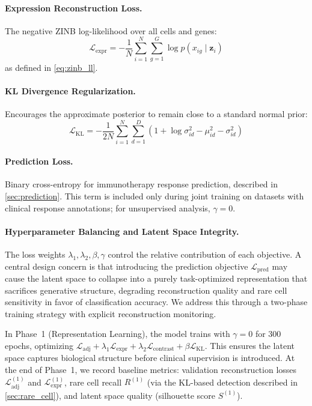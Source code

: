 \documentclass{article}
\newcommand{\KL}{\mathrm{KL}}
\begin{document}
\paragraph{Expression Reconstruction Loss.} The negative ZINB log-likelihood over all cells and genes:
\begin{equation}
    \mathcal{L}_{\text{expr}} = -\frac{1}{N} \sum_{i=1}^{N} \sum_{g=1}^{G} \log p(x_{ig} \mid \mathbf{z}_i)
    \label{eq:expr_loss}
\end{equation}
as defined in \cref{eq:zinb_ll}.

\paragraph{KL Divergence Regularization.} Encourages the approximate posterior to remain close to a standard normal prior:
\begin{equation}
    \mathcal{L}_{\KL} = -\frac{1}{2N} \sum_{i=1}^{N} \sum_{d=1}^{D} \left(1 + \log \sigma_{id}^2 - \mu_{id}^2 - \sigma_{id}^2\right)
    \label{eq:kl_loss}
\end{equation}

\paragraph{Prediction Loss.} Binary cross-entropy for immunotherapy response prediction, described in \cref{sec:prediction}. This term is included only during joint training on datasets with clinical response annotations; for unsupervised analysis, $\gamma = 0$.

\paragraph{Hyperparameter Balancing and Latent Space Integrity.} The loss weights $\lambda_1, \lambda_2, \beta, \gamma$ control the relative contribution of each objective. A central design concern is that introducing the prediction objective $\mathcal{L}_{\text{pred}}$ may cause the latent space to collapse into a purely task-optimized representation that sacrifices generative structure, degrading reconstruction quality and rare cell sensitivity in favor of classification accuracy. We address this through a two-phase training strategy with explicit reconstruction monitoring.

In Phase~1 (Representation Learning), the model trains with $\gamma = 0$ for 300 epochs, optimizing $\mathcal{L}_{\text{adj}} + \lambda_1 \mathcal{L}_{\text{expr}} + \lambda_2 \mathcal{L}_{\text{contrast}} + \beta \mathcal{L}_{\KL}$. This ensures the latent space captures biological structure before clinical supervision is introduced. At the end of Phase~1, we record baseline metrics: validation reconstruction losses $\mathcal{L}_{\text{adj}}^{(1)}$ and $\mathcal{L}_{\text{expr}}^{(1)}$, rare cell recall $R^{(1)}$ (via the KL-based detection described in \cref{sec:rare_cell}), and latent space quality (silhouette score $S^{(1)}$).
\end{document}
